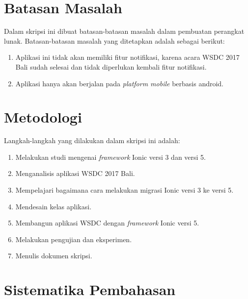 \section{Batasan Masalah}
\label{sec:batasan}
Dalam skripsi ini dibuat batasan-batasan masalah dalam pembuatan perangkat lunak.  Batasan-batasan masalah yang ditetapkan adalah sebagai berikut:

\begin{enumerate}
    \item Aplikasi ini tidak akan memiliki fitur notifikasi, karena acara WSDC 2017 Bali sudah selesai dan tidak diperlukan kembali fitur notifikasi.
    \item Aplikasi hanya akan berjalan pada \textit{platform mobile} berbasis android. 
\end{enumerate}


\section{Metodologi}
\label{sec:metlit}

Langkah-langkah yang dilakukan dalam skripsi ini adalah:

\begin{enumerate}
		\item Melakukan studi mengenai {\it framework} Ionic versi 3 dan versi 5.
		\item Menganalisis aplikasi WSDC 2017 Bali.
		\item Mempelajari bagaimana cara melakukan migrasi Ionic versi 3 ke versi 5.
		\item Mendesain kelas aplikasi.
		\item Membangun aplikasi WSDC dengan {\it framework} Ionic versi 5. 
		\item Melakukan pengujian dan eksperimen.
		\item Menulis dokumen skripsi.
	\end{enumerate}

\newpage

\section{Sistematika Pembahasan}
\label{sec:sispem}

